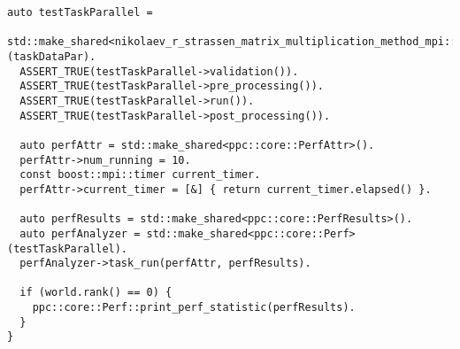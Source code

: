 \documentclass[a4paper,12pt]{article}
\begin{document}
\begin{lstlisting}[caption={Тесты функций из perf\_tests/main.cpp}]
  auto testTaskParallel =
      std::make_shared<nikolaev_r_strassen_matrix_multiplication_method_mpi::StrassenMatrixMultiplicationParallel>(taskDataPar).
  ASSERT_TRUE(testTaskParallel->validation()).
  ASSERT_TRUE(testTaskParallel->pre_processing()).
  ASSERT_TRUE(testTaskParallel->run()).
  ASSERT_TRUE(testTaskParallel->post_processing()).
  
  auto perfAttr = std::make_shared<ppc::core::PerfAttr>().
  perfAttr->num_running = 10.
  const boost::mpi::timer current_timer.
  perfAttr->current_timer = [&] { return current_timer.elapsed() }.
  
  auto perfResults = std::make_shared<ppc::core::PerfResults>().
  auto perfAnalyzer = std::make_shared<ppc::core::Perf>(testTaskParallel).
  perfAnalyzer->task_run(perfAttr, perfResults).
  
  if (world.rank() == 0) {
    ppc::core::Perf::print_perf_statistic(perfResults).
  }
}
\end{lstlisting}
\end{document}
